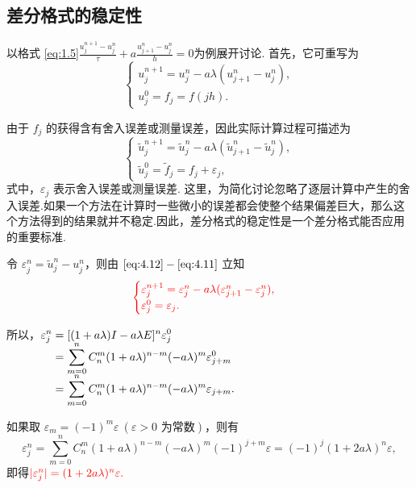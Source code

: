 \subsection*{差分格式的稳定性}

以格式 \eqref{eq:1.5}$\frac{u_j^{n+1} - u_j^n}{\tau} + a \frac{u_{j+1}^n - u_j^n}{h} = 0$为例展开讨论. 首先，它可重写为
\begin{equation}
    \begin{cases}
        u_j^{n+1} = u_j^n - a\lambda(u_{j+1}^n - u_j^n), \\
        u_j^0 = f_j = f(jh).
    \end{cases} \label{eq:4.11}
\end{equation}

由于 $f_j$ 的获得含有舍入误差或测量误差，因此实际计算过程可描述为
\begin{equation}
    \begin{cases}
        \tilde{u}_j^{n+1} = \tilde{u}_j^n - a\lambda(\tilde{u}_{j+1}^n - \tilde{u}_j^n), \\
        \tilde{u}_j^0 = \tilde{f}_j = f_j + \varepsilon_j,
    \end{cases} \label{eq:4.12}
\end{equation}
式中，$\varepsilon_j$ 表示舍入误差或测量误差. 这里，为简化讨论忽略了逐层计算中产生的舍入误差.如果一个方法在计算时一些微小的误差都会使整个结果偏差巨大，那么这个方法得到的结果就并不稳定.因此，差分格式的稳定性是一个差分格式能否应用的重要标准.\par



令 $\varepsilon_j^n = \tilde{u}_j^n - u_j^n$，则由 $\eqref{eq:4.12}-\eqref{eq:4.11}$ 立知
\[ {\color{red}
\begin{cases}
    \varepsilon_j^{n+1} = \varepsilon_j^n - a\lambda(\varepsilon_{j+1}^n - \varepsilon_j^n), \\
    \varepsilon_j^0 = \varepsilon_j.
\end{cases}
} \]

所以，$\setjot[-2]\begin{aligned}[t]
    \varepsilon_j^n &= [(1 + a\lambda)I - a\lambda E]^n \varepsilon_j^0 \\
    &= \sum_{m=0}^n C_n^m (1 + a\lambda)^{n-m} (-a\lambda)^m \varepsilon_{j+m}^0 \\
    &= \sum_{m=0}^n C_n^m (1 + a\lambda)^{n-m} (-a\lambda)^m \varepsilon_{j+m}.
\end{aligned}$\par
{\color{red} 如果取 $\varepsilon_m = (-1)^m \varepsilon \ (\varepsilon > 0 \text{ 为常数})$}，则有
\[ \varepsilon_j^n = \sum_{m=0}^n C_n^m (1 + a\lambda)^{n-m} (-a\lambda)^m (-1)^{j+m} \varepsilon = (-1)^j (1 + 2a\lambda)^n \varepsilon, \]
即得${\color{red} |\varepsilon_j^n| = (1 + 2a\lambda)^n \varepsilon.}$\par

